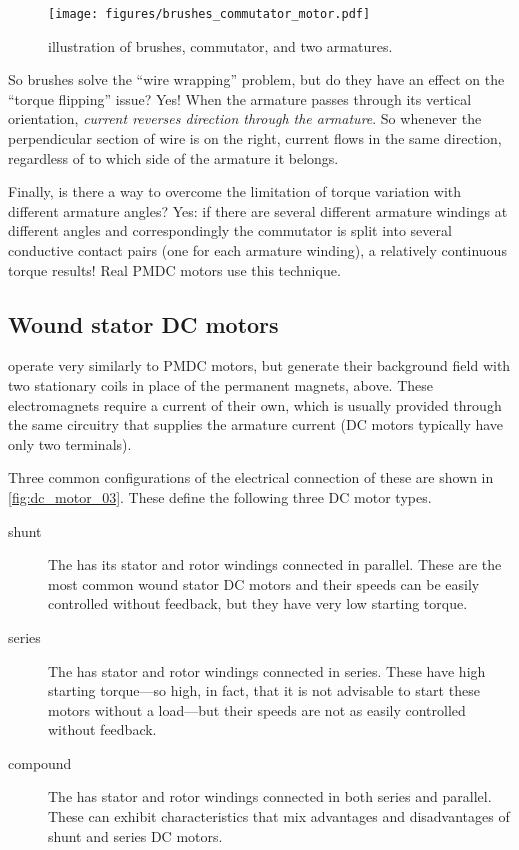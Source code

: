 \documentclass[dynamic_systems.tex]{subfiles}
\begin{document}
\begin{figure}
\centering
\texttt{[image: figures/brushes\_commutator\_motor.pdf]}
\caption{illustration of brushes, commutator, and two armatures.}
\label{fig:brushes_commutator_motor}
\end{figure}

So brushes solve the ``wire wrapping'' problem, but do they have an effect on the ``torque flipping'' issue?
Yes!
When the armature passes through its vertical orientation, \emph{current reverses direction through the armature}.
So whenever the perpendicular section of wire is on the right, current flows in the same direction, regardless of to which side of the armature it belongs.

Finally, is there a way to overcome the limitation of torque variation with different armature angles?
Yes: if there are several different armature windings at different angles and correspondingly the commutator is split into several conductive contact pairs (one for each armature winding), a relatively continuous torque results!
Real PMDC motors use this technique.

\subsection{Wound stator DC motors}
\tags{}

 operate very similarly to PMDC motors, but generate their background field with two stationary coils in place of the permanent magnets, above.
These electromagnets require a current of their own, which is usually provided through the same circuitry that supplies the armature current (DC motors typically have only two terminals).

Three common configurations of the electrical connection of these are shown in \cref{fig:dc_motor_03}.
These define the following three DC motor types.
\begin{description}
	\item[shunt] 
	The  has its stator and rotor windings connected in parallel.
	These are the most common wound stator DC motors and their speeds can be easily controlled without feedback, but they have very low starting torque.
	\item[series] The  has stator and rotor windings connected in series.
	These have high starting torque---so high, in fact, that it is not advisable to start these motors without a load---but their speeds are not as easily controlled without feedback.
	\item[compound] The  has stator and rotor windings connected in both series and parallel.
	These can exhibit characteristics that mix advantages and disadvantages of shunt and series DC motors.
\end{description}
\end{document}
